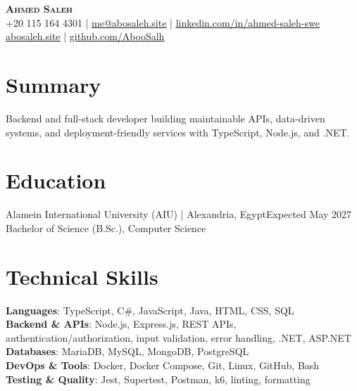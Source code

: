 \documentclass[letterpaper,11pt]{article}
\begin{document}
\begin{center}
    \textbf{\Huge \scshape Ahmed Saleh} \\ \vspace{1pt}
    +20 115 164 4301 \quad | \quad
    \href{mailto:me@abosaleh.site}{\underline{me@abosaleh.site}} \quad | \quad
    \href{https://www.linkedin.com/in/ahmed-saleh-swe/}{\underline{linkedin.com/in/ahmed-saleh-swe}} \\ \vspace{1pt}
    \href{https://abosaleh.site}{\underline{abosaleh.site}} \quad | \quad
    \href{https://github.com/AbooSalh}{\underline{github.com/AbooSalh}}
\end{center}

\section{Summary}
Backend and full-stack developer building maintainable APIs, data-driven systems, and deployment-friendly services with TypeScript, Node.js, and .NET.

\section{Education}
    \resumeSubHeadingListStart

    \resumeSubheading
    {Alamein International University (AIU) | Alexandria, Egypt}{Expected May 2027}
    {Bachelor of Science (B.Sc.), Computer Science}{ }
    \resumeItemListStart
    \resumeItemListEnd

    \resumeSubHeadingListEnd

\section{Technical Skills}
    \begin{itemize}[leftmargin=0.15in, label={}]
    \small{\item{
        \textbf{Languages}{: TypeScript, C\#, JavaScript, Java, HTML, CSS, SQL} \\
        \textbf{Backend \& APIs}{: Node.js, Express.js, REST APIs, authentication/authorization, input validation, error handling, .NET, ASP.NET} \\
        \textbf{Databases}{: MariaDB, MySQL, MongoDB, PostgreSQL} \\
        \textbf{DevOps \& Tools}{: Docker, Docker Compose, Git, Linux, GitHub, Bash} \\
        \textbf{Testing \& Quality}{: Jest, Supertest, Postman, k6, linting, formatting}
    }}
    \end{itemize}
\end{document}

